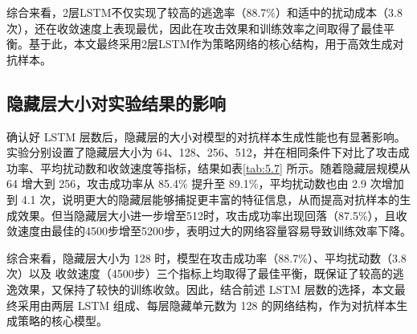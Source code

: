 综合来看，2层LSTM不仅实现了较高的逃逸率（88.7\%）和适中的扰动成本（3.8 次），还在收敛速度上表现最优，因此在攻击效果和训练效率之间取得了最佳平衡。基于此，本文最终采用2层LSTM作为策略网络的核心结构，用于高效生成对抗样本。


\subsection{隐藏层大小对实验结果的影响}

确认好 LSTM 层数后，隐藏层的大小对模型的对抗样本生成性能也有显著影响。实验分别设置了隐藏层大小为 64、128、256、512，并在相同条件下对比了攻击成功率、平均扰动数和收敛速度等指标，结果如表\ref{tab:5.7} 所示。随着隐藏层规模从 64 增大到 256，攻击成功率从 85.4\% 提升至 89.1\%，平均扰动数也由 2.9 次增加到 4.1 次，说明更大的隐藏层能够捕捉更丰富的特征信息，从而提高对抗样本的生成效果。但当隐藏层大小进一步增至512时，攻击成功率出现回落（87.5\%），且收敛速度由最佳的4500步增至5200步，表明过大的网络容量容易导致训练效率下降。


综合来看，隐藏层大小为 128 时，模型在攻击成功率（88.7\%）、平均扰动数（3.8次）以及 收敛速度（4500步）三个指标上均取得了最佳平衡，既保证了较高的逃逸效果，又保持了较快的训练收敛。因此，结合前述 LSTM 层数的选择，本文最终采用由两层 LSTM 组成、每层隐藏单元数为 128 的网络结构，作为对抗样本生成策略的核心模型。

